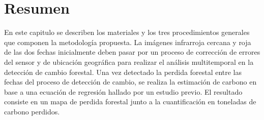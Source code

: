 \section{Resumen}
En este capitulo se describen los materiales y los tres procedimientos generales que componen la metodolog\'ia propuesta. La im\'agenes infrarroja cercana y roja de las dos fechas inicialmente deben pasar por un proceso de correcci\'on de errores del sensor y de ubicaci\'on geogr\'afica para realizar el an\'alisis multitemporal en la detecci\'on de cambio forestal. Una vez detectado la perdida forestal entre las fechas del proceso de detecci\'on de cambio, se realiza la estimaci\'on de carbono en base a una ecuaci\'on de regresi\'on hallado por un estudio previo. El resultado consiste en un mapa de perdida forestal junto a la cuantificaci\'on en toneladas de carbono perdidos.